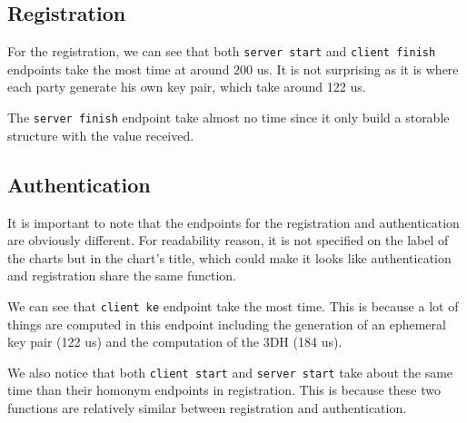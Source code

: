 \documentclass[../report.tex]{subfiles}
\begin{document}
\pgfplotsset{width=\textwidth-1.1cm}
\subsection*{Registration}

For the registration, we can see that both \verb|server start| and \verb|client finish| endpoints take the most time at around 200 us.
It is not surprising as it is where each party generate his own key pair, which take around 122 us.

The \verb|server finish| endpoint take almost no time since it only build a storable structure with the value received.



\subsection*{Authentication}

It is important to note that the endpoints for the registration and authentication are obviously different. For readability reason, it is not specified on the label of the charts but in the chart's title, which could make it looks like authentication and registration share the same function.

We can see that \verb|client ke| endpoint take the most time. This is because a lot of things are computed in this endpoint including the generation of an ephemeral key pair (122 us) and the computation of the 3DH (184 us).

We also notice that both \verb|client start| and \verb|server start| take about the same time than their homonym endpoints in registration. This is because these two functions are relatively similar between registration and authentication.
\end{document}

